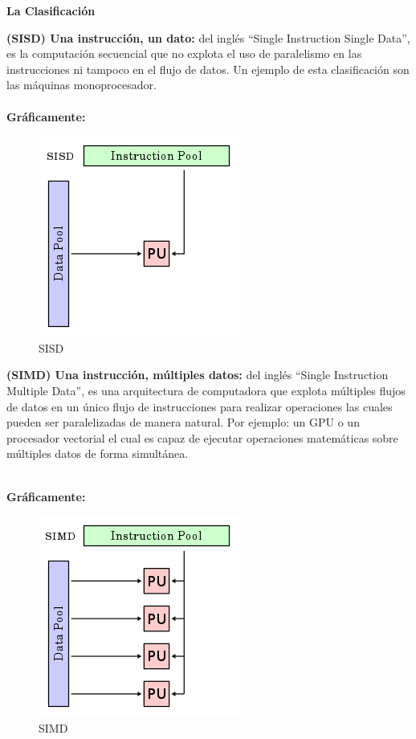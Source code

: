 \textbf{\newline \large La Clasificación}

\textbf{\newline (SISD) Una instrucción, un dato:} del inglés ``Single Instruction Single Data'', es la computación secuencial que no explota el uso de paralelismo en las instrucciones ni tampoco en el flujo de datos. Un ejemplo de esta clasificación son las máquinas monoprocesador.\\

\textbf{\\Gráficamente:}
\begin{figure}[H]
\begin{center}
  \includegraphics[scale=0.7]{images/SISD.png}
\caption{SISD}
\label{fig:SISD}
\end{center}
\end{figure} 

\textbf{\newline (SIMD) Una instrucción, múltiples datos:} del inglés ``Single Instruction Multiple Data'', es una arquitectura de computadora que explota múltiples flujos de datos en un único flujo de instrucciones para realizar operaciones las cuales pueden ser paralelizadas de manera natural. Por ejemplo: un GPU o un procesador vectorial el cual es capaz de ejecutar operaciones matemáticas sobre múltiples datos de forma simultánea.\\
\newpage

\textbf{\\Gráficamente: }

\begin{figure}[H]
\begin{center}
\includegraphics[scale=0.7]{images/SIMD.png}
\caption{SIMD}
\label{fig:SIMD}
\end{center}
\end{figure} 

